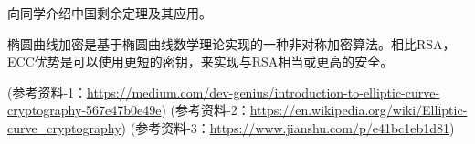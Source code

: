 \documentclass[a4paper, justified]{tufte-handout}
\begin{document}
\begin{solution}
\end{solution}


\beginot
\begin{ot}[中国剩余定理]	
	向同学介绍中国剩余定理及其应用。
\end{ot}


\begin{ot}	
	椭圆曲线加密是基于椭圆曲线数学理论实现的一种非对称加密算法。相比RSA，ECC优势是可以使用更短的密钥，来实现与RSA相当或更高的安全。
	
	(参考资料-1：\href{https://medium.com/dev-genius/introduction-to-elliptic-curve-cryptography-567e47b0e49e}{https://medium.com/dev-genius/introduction-to-elliptic-curve-cryptography-567e47b0e49e})
	(参考资料-2：\href{https://en.wikipedia.org/wiki/Elliptic-curve_cryptography}{https://en.wikipedia.org/wiki/Elliptic-curve\_cryptography})
	(参考资料-3：\href{https://www.jianshu.com/p/e41bc1eb1d81}{https://www.jianshu.com/p/e41bc1eb1d81})
\end{ot}




% 




\beginfb

% 
% 
\end{document}
